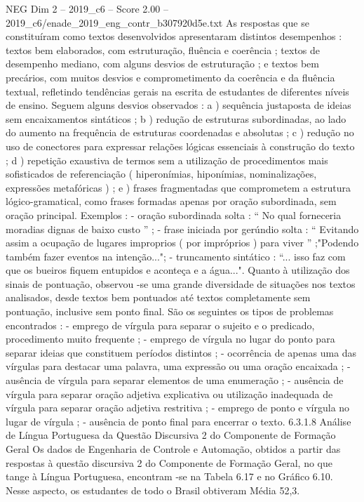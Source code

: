 \begin{textsample}{NEG Dim 2 – 2019\_c6 – Score 2.00 – 2019\_c6/enade\_2019\_eng\_contr\_b307920d5e.txt}
As respostas que se constituíram como textos desenvolvidos apresentaram distintos desempenhos : textos bem elaborados, com estruturação, fluência e coerência ; textos de desempenho mediano, com alguns desvios de estruturação ; e textos bem precários, com muitos desvios e comprometimento da coerência e da fluência textual, refletindo tendências gerais na escrita de estudantes de diferentes níveis de ensino.
Seguem alguns desvios observados : a ) sequência justaposta de ideias sem encaixamentos sintáticos ; b ) redução de estruturas subordinadas, ao lado do aumento na frequência de estruturas coordenadas e absolutas ; c ) redução no uso de conectores para expressar relações lógicas essenciais à construção do texto ; d ) repetição exaustiva de termos sem a utilização de procedimentos mais sofisticados de referenciação ( hiperonímias, hiponímias, nominalizações, expressões metafóricas ) ; e ) frases fragmentadas que comprometem a estrutura lógico-gramatical, como frases formadas apenas por oração subordinada, sem oração principal.
Exemplos : - oração subordinada solta : “ No qual forneceria moradias dignas de baixo custo ” ; - frase iniciada por gerúndio solta : “ Evitando assim a ocupação de lugares improprios ( por impróprios ) para viver ” ;"Podendo também fazer eventos na intenção..."; - truncamento sintático : “... isso faz com que os bueiros fiquem entupidos e aconteça e a água...".
Quanto à utilização dos sinais de pontuação, observou -se uma grande diversidade de situações nos textos analisados, desde textos bem pontuados até textos completamente sem pontuação, inclusive sem ponto final.
São os seguintes os tipos de problemas encontrados : - emprego de vírgula para separar o sujeito e o predicado, procedimento muito frequente ; - emprego de vírgula no lugar do ponto para separar ideias que constituem períodos distintos ; - ocorrência de apenas uma das vírgulas para destacar uma palavra, uma expressão ou uma oração encaixada ; - ausência de vírgula para separar elementos de uma enumeração ; - ausência de vírgula para separar oração adjetiva explicativa ou utilização inadequada de vírgula para separar oração adjetiva restritiva ; - emprego de ponto e vírgula no lugar de vírgula ; - ausência de ponto final para encerrar o texto. 6.3.1.8 Análise de Língua Portuguesa da Questão Discursiva 2 do Componente de Formação Geral Os dados de Engenharia de Controle e Automação, obtidos a partir das respostas à questão discursiva 2 do Componente de Formação Geral, no que tange à Língua Portuguesa, encontram -se na Tabela 6.17 e no Gráfico 6.10.
Nesse aspecto, os estudantes de todo o Brasil obtiveram Média 52,3.

\end{textsample}
